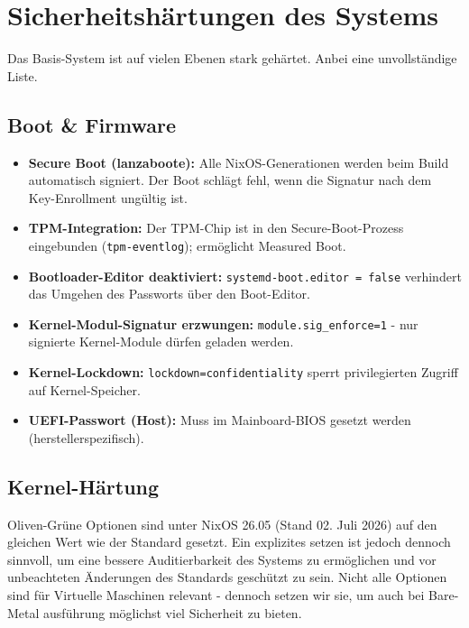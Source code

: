 \section{Sicherheitshärtungen des Systems}
\label{sec:hardening}
Das Basis-System ist auf vielen Ebenen stark gehärtet. Anbei eine unvollständige Liste.

\subsection{Boot \& Firmware}
\begin{itemize}
  \item \textbf{Secure Boot (lanzaboote):} Alle NixOS-Generationen werden beim Build automatisch signiert. Der Boot schlägt fehl, wenn die Signatur nach dem Key-Enrollment ungültig ist.
  \item \textbf{TPM-Integration:} Der TPM-Chip ist in den Secure-Boot-Prozess eingebunden (\texttt{tpm-eventlog}); ermöglicht Measured Boot.
  \item \textbf{Bootloader-Editor deaktiviert:} \texttt{systemd-boot.editor = false} verhindert das Umgehen des Passworts über den Boot-Editor.
  \item \textbf{Kernel-Modul-Signatur erzwungen:} \texttt{module.sig\_enforce=1} - nur signierte Kernel-Module dürfen geladen werden.
  \item \textbf{Kernel-Lockdown:} \texttt{lockdown=confidentiality} sperrt privilegierten Zugriff auf Kernel-Speicher.
  \item \textbf{UEFI-Passwort (Host):} Muss im Mainboard-BIOS gesetzt werden (herstellerspezifisch).
\end{itemize}

\subsection{Kernel-Härtung}
\textcolor{OliveGreen}{Oliven-Grüne} Optionen sind unter NixOS 26.05 (Stand 02. Juli 2026) auf den gleichen Wert wie der Standard gesetzt. Ein explizites setzen ist jedoch dennoch sinnvoll, um eine bessere Auditierbarkeit des Systems zu ermöglichen und vor unbeachteten Änderungen des Standards geschützt zu sein.
Nicht alle Optionen sind für Virtuelle Maschinen relevant - dennoch setzen wir sie, um auch bei Bare-Metal ausführung möglichst viel Sicherheit zu bieten.

